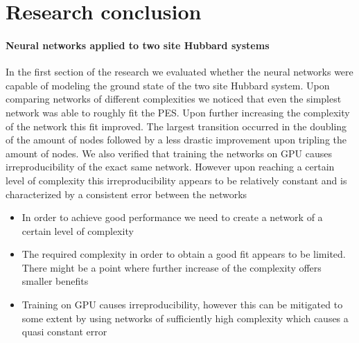 \documentclass[12pt]{article}
\begin{document}
\newpage
\section{Research conclusion}

\paragraph{Neural networks applied to two site Hubbard systems}
In the first section of the research we evaluated whether the neural networks were capable of modeling the ground state of the two site Hubbard system. Upon comparing networks of different complexities we noticed that even the simplest network was able to roughly fit the PES. Upon further increasing the complexity of the network this fit improved. The largest transition occurred in the doubling of the amount of nodes followed by a less drastic improvement upon tripling the amount of nodes. We also verified that training the networks on GPU causes irreproducibility of the exact same network. However upon reaching a certain level of complexity this irreproducibility appears to be relatively constant and is characterized by a consistent error between the networks 
\begin{itemize}
	\item In order to achieve good performance we need to create a network of a certain level of complexity
	\item The required complexity in order to obtain a good fit appears to be limited. There might be a point where further increase of the complexity offers smaller benefits
	\item Training on GPU causes irreproducibility, however this can be mitigated to some extent by using networks of sufficiently high complexity which causes a quasi constant error
\end{itemize}
\end{document}
